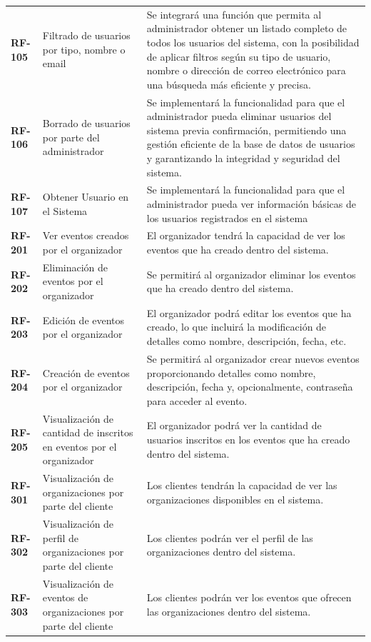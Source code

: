 \begin{longtable}{ p{2.5cm} p{4cm} p{9cm}  }
    \textbf{RF-105} & Filtrado de usuarios por tipo, nombre o email & Se integrará una función que permita al administrador obtener un 
    listado completo de todos los usuarios del sistema, con la posibilidad de aplicar filtros según su tipo de usuario, nombre o dirección 
    de correo electrónico para una búsqueda más eficiente y precisa.\\
    \textbf{RF-106} & Borrado de usuarios por parte del administrador & Se implementará la funcionalidad para que el administrador pueda 
    eliminar usuarios del sistema previa confirmación, permitiendo una gestión eficiente de la base de datos de usuarios y garantizando la integridad 
    y seguridad del sistema.\\
    \textbf{RF-107} & Obtener Usuario en el Sistema & Se implementará la funcionalidad para que el administrador pueda 
    ver información básicas de los usuarios registrados en el sistema\\
    \textbf{RF-201} & Ver eventos creados por el organizador & El organizador tendrá la capacidad de ver los eventos que ha creado dentro del sistema.\\
    \textbf{RF-202} & Eliminación de eventos por el organizador & Se permitirá al organizador eliminar los eventos que ha creado dentro del sistema.\\
    \textbf{RF-203} & Edición de eventos por el organizador & El organizador podrá editar los eventos que ha creado, lo que incluirá la modificación de 
    detalles como nombre, descripción, fecha, etc.\\
    \textbf{RF-204} & Creación de eventos por el organizador & Se permitirá al organizador crear nuevos eventos proporcionando detalles como nombre, descripción, 
    fecha y, opcionalmente, contraseña para acceder al evento.\\
    \textbf{RF-205} & Visualización de cantidad de inscritos en eventos por el organizador & El organizador podrá ver la cantidad de usuarios inscritos en los 
    eventos que ha creado dentro del sistema.\\
    \textbf{RF-301} & Visualización de organizaciones por parte del cliente & Los clientes tendrán la capacidad de ver las organizaciones disponibles en el sistema.\\
    \textbf{RF-302} & Visualización de perfil de organizaciones por parte del cliente & Los clientes podrán ver el perfil de las organizaciones dentro del sistema.\\
    \textbf{RF-303} & Visualización de eventos de organizaciones por parte del cliente & Los clientes podrán ver los eventos que ofrecen las organizaciones dentro del sistema.\\

\end{longtable}
